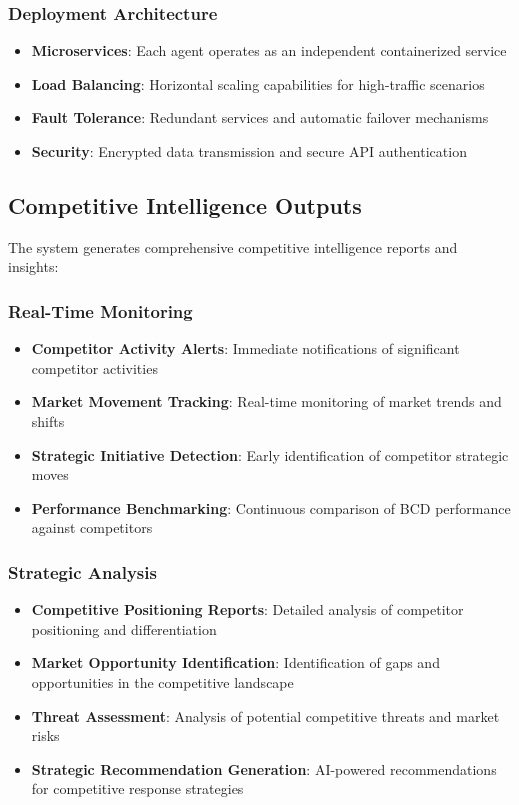 \subsubsection{Deployment Architecture}
\begin{itemize}
    \item \textbf{Microservices}: Each agent operates as an independent containerized service
    \item \textbf{Load Balancing}: Horizontal scaling capabilities for high-traffic scenarios
    \item \textbf{Fault Tolerance}: Redundant services and automatic failover mechanisms
    \item \textbf{Security}: Encrypted data transmission and secure API authentication
\end{itemize}

\subsection{Competitive Intelligence Outputs}

The system generates comprehensive competitive intelligence reports and insights:

\subsubsection{Real-Time Monitoring}
\begin{itemize}
    \item \textbf{Competitor Activity Alerts}: Immediate notifications of significant competitor activities
    \item \textbf{Market Movement Tracking}: Real-time monitoring of market trends and shifts
    \item \textbf{Strategic Initiative Detection}: Early identification of competitor strategic moves
    \item \textbf{Performance Benchmarking}: Continuous comparison of BCD performance against competitors
\end{itemize}

\subsubsection{Strategic Analysis}
\begin{itemize}
    \item \textbf{Competitive Positioning Reports}: Detailed analysis of competitor positioning and differentiation
    \item \textbf{Market Opportunity Identification}: Identification of gaps and opportunities in the competitive landscape
    \item \textbf{Threat Assessment}: Analysis of potential competitive threats and market risks
    \item \textbf{Strategic Recommendation Generation}: AI-powered recommendations for competitive response strategies
\end{itemize}

